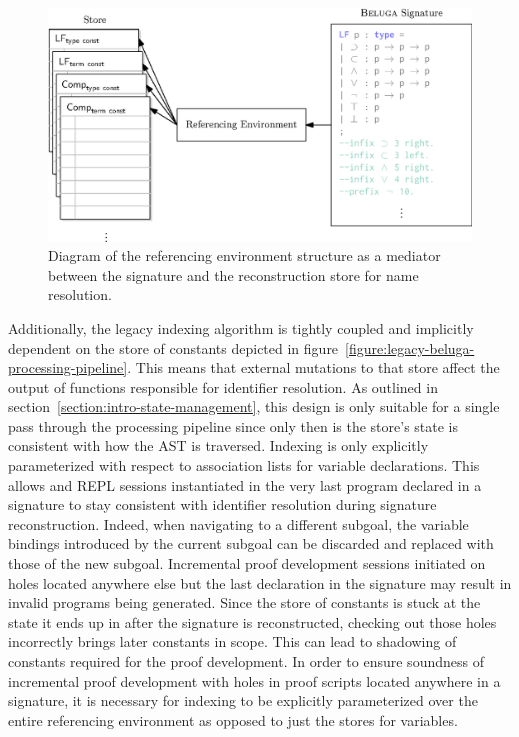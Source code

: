 \begin{figure}[htb]
\centering
\includegraphics{figures/referencing-environment-architecture.eps}
\caption[Role of the referencing environment in \Beluga]{%
Diagram of the referencing environment structure as a mediator between the \Beluga signature and the reconstruction store for name resolution.
}
\label{figure:referencing-environment-architecture}
\end{figure}

Additionally, the legacy indexing algorithm is tightly coupled and implicitly dependent on the store of constants depicted in figure~\ref{figure:legacy-beluga-processing-pipeline}.
This means that external mutations to that store affect the output of functions responsible for identifier resolution.
As outlined in section~\ref{section:intro-state-management}, this design is only suitable for a single pass through the processing pipeline since only then is the store's state is consistent with how the \ac{AST} is traversed.
Indexing is only explicitly parameterized with respect to association lists for variable declarations.
This allows \Harpoon and \ac{REPL} sessions instantiated in the very last program declared in a \Beluga signature to stay consistent with identifier resolution during signature reconstruction.
Indeed, when navigating to a different \Harpoon subgoal, the variable bindings introduced by the current subgoal can be discarded and replaced with those of the new subgoal.
Incremental proof development sessions initiated on holes located anywhere else but the last declaration in the signature may result in invalid programs being generated.
Since the store of constants is stuck at the state it ends up in after the signature is reconstructed, checking out those holes incorrectly brings later constants in scope.
This can lead to shadowing of constants required for the proof development.
In order to ensure soundness of incremental proof development with holes in proof scripts located anywhere in a signature, it is necessary for indexing to be explicitly parameterized over the entire referencing environment as opposed to just the stores for variables.

